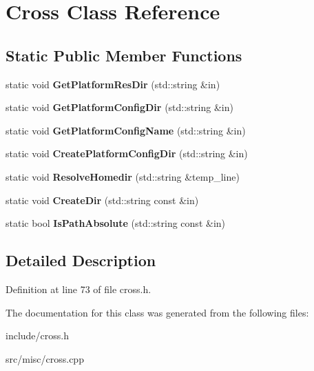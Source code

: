 \hypertarget{classCross}{\section{Cross Class Reference}
\label{classCross}
}
\subsection*{Static Public Member Functions}
\begin{DoxyCompactItemize}
\item 
\hypertarget{classCross_a73843b748a4bb6c2d4167407cd893676}{static void {\bfseries Get\-Platform\-Res\-Dir} (std\-::string \&in)}\label{classCross_a73843b748a4bb6c2d4167407cd893676}

\item 
\hypertarget{classCross_ae970b76d2aaead7f55e7b1a05574a880}{static void {\bfseries Get\-Platform\-Config\-Dir} (std\-::string \&in)}\label{classCross_ae970b76d2aaead7f55e7b1a05574a880}

\item 
\hypertarget{classCross_a76229c50352b8f4f44dbcd68a7fb4f7d}{static void {\bfseries Get\-Platform\-Config\-Name} (std\-::string \&in)}\label{classCross_a76229c50352b8f4f44dbcd68a7fb4f7d}

\item 
\hypertarget{classCross_ac95e21d0ca9ec1e467b680e9bdbbfc33}{static void {\bfseries Create\-Platform\-Config\-Dir} (std\-::string \&in)}\label{classCross_ac95e21d0ca9ec1e467b680e9bdbbfc33}

\item 
\hypertarget{classCross_ac79890893bb87e04d37f8d2935cc80a8}{static void {\bfseries Resolve\-Homedir} (std\-::string \&temp\-\_\-line)}\label{classCross_ac79890893bb87e04d37f8d2935cc80a8}

\item 
\hypertarget{classCross_a5942ca2c5adb8ca7b27901e6f6346fae}{static void {\bfseries Create\-Dir} (std\-::string const \&in)}\label{classCross_a5942ca2c5adb8ca7b27901e6f6346fae}

\item 
\hypertarget{classCross_aed9b05e77ca4087abed9cfd0460c7408}{static bool {\bfseries Is\-Path\-Absolute} (std\-::string const \&in)}\label{classCross_aed9b05e77ca4087abed9cfd0460c7408}

\end{DoxyCompactItemize}


\subsection{Detailed Description}


Definition at line 73 of file cross.\-h.



The documentation for this class was generated from the following files\-:\begin{DoxyCompactItemize}
\item 
include/cross.\-h\item 
src/misc/cross.\-cpp\end{DoxyCompactItemize}
